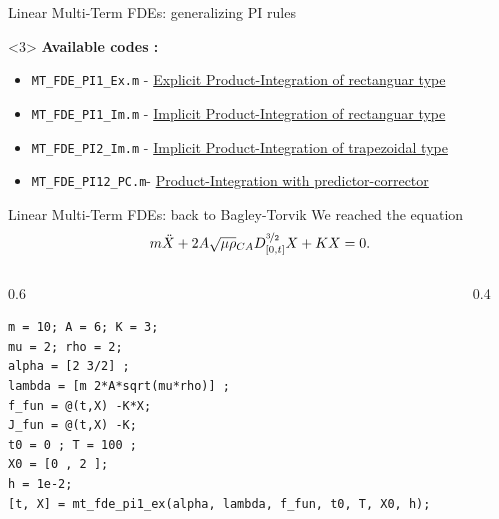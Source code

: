 \documentclass[aspectratio=169,xcolor=dvipsnames]{beamer}
\begin{document}
\begin{frame}[fragile]{Linear Multi-Term FDEs: generalizing PI rules}



\begin{onlyenv}<3>
\small
\textbf{Available codes \parencite{garrappa2018numerical}:}
\begin{itemize}
	\item[\faCode] \verb|MT_FDE_PI1_Ex.m| - \href{https://www.dm.uniba.it/members/garrappa/software_folder/mt_fde_pi1_ex.m}{Explicit Product-Integration of rectanguar type}
	\item[\faCode] \verb|MT_FDE_PI1_Im.m| - \href{https://www.dm.uniba.it/members/garrappa/software_folder/mt_fde_pi1_im.m}{Implicit Product-Integration of rectanguar type}
	\item[\faCode] \verb|MT_FDE_PI2_Im.m| - \href{https://www.dm.uniba.it/members/garrappa/software_folder/mt_fde_pi2_im.m}{Implicit Product-Integration of trapezoidal type}
	\item[\faCode] \verb|MT_FDE_PI12_PC.m|- \href{https://www.dm.uniba.it/members/garrappa/software_folder/mt_fde_pi12_pc.m}{Product-Integration with predictor-corrector}
\end{itemize} 
\end{onlyenv}

\end{frame}

\begin{frame}[fragile]{Linear Multi-Term FDEs: back to Bagley-Torvik}
We reached the equation
\[
m \ddot{X}  + 2A \sqrt{\mu \rho} {}_{CA}D^{\nicefrac{3}{2}}_{[0,t]} X + K X = 0.
\]\vspace{-2em}
\begin{columns}
\begin{column}{0.6\columnwidth}
\begin{verbatim}
m = 10; A = 6; K = 3;
mu = 2; rho = 2;
alpha = [2 3/2] ;
lambda = [m 2*A*sqrt(mu*rho)] ;
f_fun = @(t,X) -K*X;
J_fun = @(t,X) -K;
t0 = 0 ; T = 100 ;
X0 = [0 , 2 ];
h = 1e-2;
[t, X] = mt_fde_pi1_ex(alpha, lambda, f_fun, t0, T, X0, h);
\end{verbatim}
\end{column}
\begin{column}{0.4\columnwidth}
\centering


\end{column}
\end{columns}


\end{frame}
\end{document}
